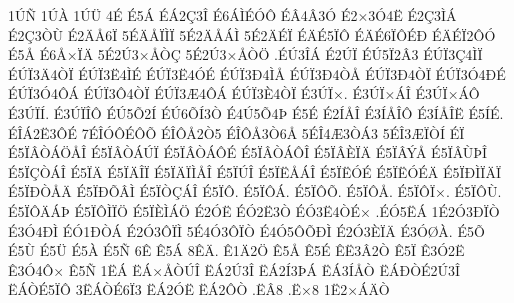 {1^^da^^d1
1^^da^^c0
1^^da^^dc
4^^c9
^^c95^^c1
^^c9^^c12^^c73^^ce
^^c96^^c1^^cc^^c9^^d3^^d4
^^c9^^c24^^c23^^d3
^^c92^^d73^^d34^^cb
^^c92^^c73^^cc^^c1
^^c92^^c73^^d2^^d9
^^c92^^c4^^c56^^cf
5^^c9^^c4^^c5^^cf^^cc^^cf
5^^c92^^c4^^c5^^c1^^cc
5^^c92^^c4^^c9^^cf
^^c9^^c4^^c95^^cf^^d4
^^c9^^c4^^c96^^cf^^d4^^c9^^d0
^^c9^^c4^^c9^^cf2^^d4^^d3
^^c95^^c5
^^c96^^c5^^d7^^cf^^c4
5^^c92^^da3^^d7^^c5^^d2^^c7
5^^c92^^da3^^d7^^c5^^d2^^d6
.^^c9^^da3^^ce^^c1
^^c92^^da^^cf
^^c9^^da5^^cf2^^c23
^^c9^^da^^cf3^^c74^^cc^^cf
^^c9^^da^^cf3^^c44^^d2^^cf
^^c9^^da^^cf3^^cb4^^cc^^c9
^^c9^^da^^cf3^^cb4^^d3^^c9
^^c9^^da^^cf3^^d04^^cc^^c5
^^c9^^da^^cf3^^d04^^d2^^c5
^^c9^^da^^cf3^^d04^^d2^^cf
^^c9^^da^^cf3^^d34^^d0^^c9
^^c9^^da^^cf3^^d34^^d4^^c1
^^c9^^da^^cf3^^d44^^d2^^cf
^^c9^^da^^cf3^^c64^^d4^^c1
^^c9^^da^^cf3^^c84^^d2^^cf
^^c93^^da^^cf^^d7.
^^c93^^da^^cf^^d7^^c1^^ce
^^c93^^da^^cf^^d7^^c1^^d4
^^c93^^da^^cf^^cd.
^^c93^^da^^cf^^ce^^d4
^^c9^^da5^^d52^^cd
^^c9^^da6^^d5^^cd3^^d2
^^c94^^da5^^d54^^de
^^c95^^c9
^^c92^^cd^^c5^^ce
^^c93^^cd^^c5^^ce^^d4
^^c93^^cd^^c5^^ce^^cb
^^c95^^cd^^c9.
^^c9^^ce^^c12^^cb3^^d4^^c9
7^^c9^^ce^^d3^^d4^^c9^^d4^^d5
^^c9^^ce^^d4^^c52^^d25
^^c9^^ce^^d4^^c53^^d26^^c5
5^^c9^^ce4^^c63^^d2^^c13
5^^c9^^ce3^^c6^^cf^^d2^^cd
^^c9^^cf
^^c95^^cf^^c2^^d2^^c1^^d6^^c5^^ce
^^c95^^cf^^c2^^d2^^c1^^da^^cf
^^c95^^cf^^c2^^d2^^c1^^d4^^c9
^^c95^^cf^^c2^^d2^^c1^^d4^^ce
^^c95^^cf^^c2^^c8^^cf^^c4
^^c95^^cf^^c2^^dd^^c5
^^c95^^cf^^c2^^d9^^de^^ce
^^c95^^cf^^c7^^d2^^c1^^ce
^^c95^^cf^^c4
^^c95^^cf^^c4^^ce^^cf
^^c95^^cf^^c4^^cf^^cc^^c5^^ce
^^c95^^cf^^da^^ce
^^c95^^cf^^cb^^c5^^c1^^ce
^^c95^^cf^^cb^^d3^^c9
^^c95^^cf^^cb^^d3^^c9^^c4
^^c95^^cf^^d0^^cc^^cf^^c4^^cf
^^c95^^cf^^d0^^d2^^c5^^c4
^^c95^^cf^^d0^^d5^^c2^^cc
^^c95^^cf^^d2^^c7^^c1^^ce
^^c95^^cf^^d4.
^^c95^^cf^^d4^^c1.
^^c95^^cf^^d4^^d5.
^^c95^^cf^^d4^^c5.
^^c95^^cf^^d4^^cf^^d7.
^^c95^^cf^^d4^^d9.
^^c95^^cf^^d4^^c4^^c1^^de
^^c95^^cf^^d4^^cc^^cf^^d6
^^c95^^cf^^c8^^cc^^c1^^d6
^^c92^^d3^^cb
^^c9^^d32^^cb3^^d2
^^c9^^d33^^cb4^^d2^^c9^^d7
.^^c9^^d35^^cb^^c1
1^^c92^^d33^^d0^^cf^^d2
^^c93^^d34^^d0^^cc
^^c9^^d31^^d0^^d2^^c1
^^c92^^d33^^d4^^cf^^cc
5^^c94^^d33^^d4^^cf^^d2
^^c94^^d35^^d4^^d5^^d0^^cc
^^c92^^d33^^c8^^cf^^c4
^^c93^^d3^^d8^^c0.
^^c95^^d5
^^c95^^d9
^^c95^^dc
^^c95^^c0
^^c95^^d1
6^^ca
^^ca5^^c1
8^^ca^^c4.
^^ca1^^c42^^d6
^^ca5^^c5
^^ca5^^c9
^^ca^^cb3^^c22^^d2
^^ca5^^cf
^^ca3^^d32^^cb
^^ca3^^d34^^d4^^d7
^^ca5^^d1
1^^cb^^c1
^^cb^^c1^^d7^^c5^^d2^^da^^ce
^^cb^^c12^^da3^^ce
^^cb^^c12^^cd3^^de^^c1
^^cb^^c13^^cd^^c5^^d2
^^cb^^c1^^d0^^d2^^c92^^da3^^ce
^^cb^^c1^^d2^^c95^^cf^^d4
3^^cb^^c1^^d2^^c96^^cf3
^^cb^^c12^^d3^^cb
^^cb^^c12^^d4^^d2
.^^cb^^c28
.^^cb^^d78
1^^cb2^^d7^^c1^^c4^^d2
}
